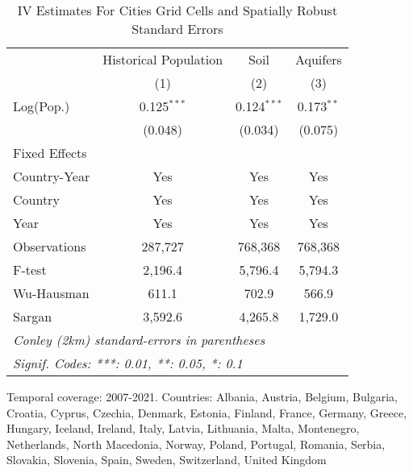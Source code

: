 
\begin{table}[htbp]
   \caption{\label{tab:within_lez_iv_all_conley} IV Estimates For Cities Grid Cells and Spatially Robust Standard Errors}
   \centering
   \small
   \begin{tabular}{lccc}
      \tabularnewline \midrule \midrule
                   & Historical Population & Soil          & Aquifers \\   
                   & (1)                   & (2)           & (3)\\  
      Log(Pop.)    & 0.125$^{***}$         & 0.124$^{***}$ & 0.173$^{**}$\\   
                   & (0.048)               & (0.034)       & (0.075)\\   
      Fixed Effects\\
      Country-Year & Yes                   & Yes           & Yes\\  
      Country      & Yes                   & Yes           & Yes\\  
      Year         & Yes                   & Yes           & Yes\\  
      \midrule 
      Observations & 287,727               & 768,368       & 768,368\\  
      F-test       & 2,196.4               & 5,796.4       & 5,794.3\\  
      Wu-Hausman   & 611.1                 & 702.9         & 566.9\\  
      Sargan       & 3,592.6               & 4,265.8       & 1,729.0\\  
      \midrule \midrule
      \multicolumn{4}{l}{\emph{Conley (2km) standard-errors in parentheses}}\\
      \multicolumn{4}{l}{\emph{Signif. Codes: ***: 0.01, **: 0.05, *: 0.1}}\\
   \end{tabular}
   
   \par \raggedright 
   Temporal coverage: 2007-2021. Countries: Albania, Austria, Belgium, Bulgaria, Croatia, Cyprus, Czechia, Denmark, Estonia, Finland, France, Germany, Greece, Hungary, Iceland, Ireland, Italy, Latvia, Lithuania, Malta, Montenegro, Netherlands, North Macedonia, Norway, Poland, Portugal, Romania, Serbia, Slovakia, Slovenia, Spain, Sweden, Switzerland, United Kingdom
\end{table}


